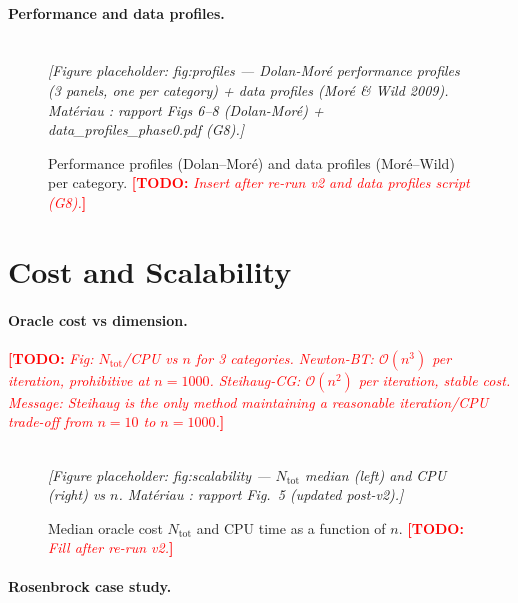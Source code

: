 \documentclass[11pt,a4paper]{article}
\newcommand{\TODO}[1]{\textcolor{red}{\textbf{[TODO:} \textit{#1}\textbf{]}}}
\newcommand{\FIG}[1]{%
  \begin{center}
    \fbox{\rule{0pt}{3.5cm}\rule{0.85\linewidth}{0pt}}\\[2pt]
    {\small\textit{[Figure placeholder: #1]}}
  \end{center}}
\newcommand{\TAB}[1]{%
  \begin{center}
    \fbox{\parbox{0.85\linewidth}{\centering\vspace{1.2em}
      \small\textit{[Table placeholder: #1]}\vspace{1.2em}}}
  \end{center}}
\newcommand{\norm}[1]{\lVert#1\rVert}
\newcommand{\Ntot}{N_{\mathrm{tot}}}
\newcommand{\SteihaugCG}{Steihaug-CG\xspace}
\begin{document}
\paragraph{Performance and data profiles.}

\begin{figure}[htbp]
  \centering
  \FIG{fig:profiles --- Dolan-Moré performance profiles (3 panels,
       one per category) + data profiles (Moré \& Wild 2009).
       Matériau : rapport Figs 6--8 (Dolan-Moré) + data\_profiles\_phase0.pdf (G8).}
  \caption{Performance profiles (Dolan--Moré) and data profiles
    (Moré--Wild) per category.
    \TODO{Insert after re-run v2 and data profiles script (G8).}}
  \label{fig:profiles}
\end{figure}

\section{Cost and Scalability}
\label{sec:scalability}

\paragraph{Oracle cost vs dimension.}
\TODO{Fig: $\Ntot$/CPU vs $n$ for 3 categories.
Newton-BT: $\mathcal{O}(n^3)$ per iteration, prohibitive at $n=1000$.
\SteihaugCG: $\mathcal{O}(n^2)$ per iteration, stable cost.
Message: Steihaug is the only method maintaining a reasonable
iteration/CPU trade-off from $n=10$ to $n=1000$.}

\begin{figure}[htbp]
  \centering
  \FIG{fig:scalability --- $\Ntot$ median (left) and CPU (right) vs $n$.
       Matériau : rapport Fig.~5 (updated post-v2).}
  \caption{Median oracle cost $\Ntot$ and CPU time as a function of $n$.
    \TODO{Fill after re-run v2.}}
  \label{fig:scalability}
\end{figure}

\paragraph{Rosenbrock case study.}

\TAB{Table: Rosenbrock $n=10$, $x_0=(-1.2,1,\ldots)^\top$.
3 methods: Steihaug-CG, BFGS-Wolfe, Newton-BT.
Columns: iterations, $\norm{\nabla f}_{\mathrm{final}}$, $\#f$, $\#\nabla f$.
(Rapport Table 6.)}
\end{document}

